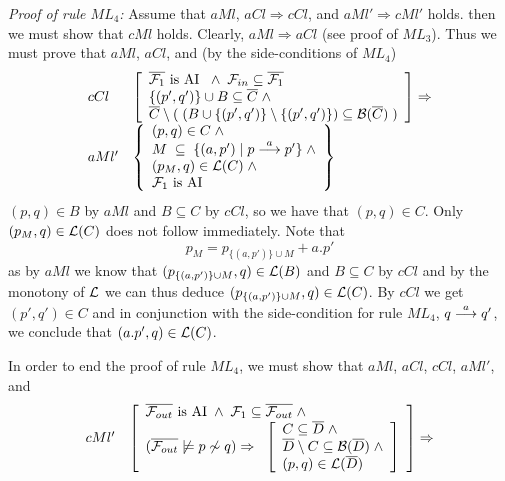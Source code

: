 \begin{theorem}[Soundness]
\begin{trivlist}
\item[\it Proof of rule\/ $ML_4$:]
Assume that $aMl$, $aCl\Rightarrow cCl$, and $aMl'\Rightarrow cMl'$ holds. then we must show that $cMl$ holds. Clearly, $aMl\Rightarrow aCl$ (see proof of $ML_3$). Thus we must prove that $aMl$, $aCl$, and (by the side-conditions of $ML_4$)
\[
\begin{array}{ll}
cCl &
\left[
\begin{array}{l}
\overline{{\cal F}_{1}} \mbox{ is AI }\;\wedge\;{\cal F}_{in}\subseteq \overline{{\cal F}_{1}}\\
\{(p',q')\}\cup B \subseteq \overline{C}\;\wedge\\
\overline{C}\setminus(\; (B\cup\{(p',q')\}\setminus\{(p',q')\})\subseteq{\cal B}(\overline{C})\;)
\end{array}
\right]\Rightarrow\\

aMl' &
\left\{
\begin{array}{l}
(p,q)\in C\;\wedge\\
M\;\subseteq\;\{(a,p')\mid p\stackrel{a}{\longrightarrow}p'\}\;\wedge\\
(p_M,q)\in{\cal L}(C)\;\wedge\\
{\cal F}_{1} \mbox{ is AI}
\end{array}\right\}
\end{array}
\]
$(p,q)\in B$ by $aMl$ and $B\subseteq C$ by $cCl$, so we have that $(p,q)\in C$. Only $(p_M,q)\in{\cal L}(C)$ does not follow immediately. Note that
\[
p_M = p_{\{(a,p')\}\cup M} + a.p'
\]
as by $aMl$ we know that $(p_{\{(a,p')\}\cup M},q)\in{\cal L}(B)$ and $B\subseteq C$ by $cCl$ and by the monotony of $\cal L$ we can thus deduce $(p_{\{(a,p')\}\cup M},q)\in{\cal L}(C)$. By $cCl$ we get $(p',q')\in C$ and in conjunction with the side-condition for rule $ML_4$, $q\stackrel{a}{\longrightarrow}q'$, we conclude that $(a.p',q)\in{\cal L}(C)$.

\noindent
In order to end the proof of rule $ML_4$, we must show that $aMl$, $aCl$, $cCl$, $aMl'$, and
\[
\begin{array}{ll}
cMl' &
\left[
\begin{array}{l}
\overline{{\cal F}_{out}}  \mbox{ is AI} \;\wedge\;{\cal F}_{1}\subseteq\overline{{\cal F}_{out}}\;\wedge\\
(\overline{{\cal F}_{out}}\not\models p\not\sim q)\Rightarrow\;\;
\left[
\begin{array}{l}
C\subseteq \overline{D}\; \wedge\\
\overline{D}\setminus C\subseteq {\cal B}(\overline{D})\;\wedge\\
(p,q)\in{\cal L}(\overline{D})
\end{array}
\right]
\end{array}
\right]\Rightarrow\\


\end{array}\]
\end{trivlist}
\end{theorem}
